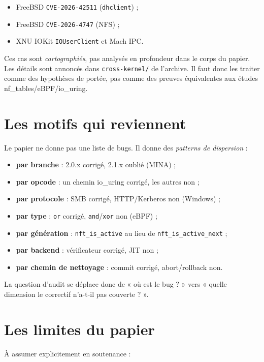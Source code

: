 \documentclass{training}
\begin{document}
\begin{itemize}
  \item FreeBSD \texttt{CVE-2026-42511} (\texttt{dhclient}) ;
  \item FreeBSD \texttt{CVE-2026-4747} (NFS) ;
  \item XNU IOKit \texttt{IOUserClient} et Mach IPC.
\end{itemize}

Ces cas sont \emph{cartographiés}, pas analysés en profondeur dans le corps du
papier. Les détails sont annoncés dans \texttt{cross-kernel/} de l'archive.
Il faut donc les traiter comme des hypothèses de portée, pas comme des
preuves équivalentes aux études nf\_tables/eBPF/io\_uring.

\chapter{Les motifs qui reviennent}

Le papier ne donne pas une liste de bugs. Il donne des \emph{patterns de
dispersion} :

\begin{itemize}
  \item \textbf{par branche} : 2.0.x corrigé, 2.1.x oublié (MINA) ;
  \item \textbf{par opcode} : un chemin io\_uring corrigé, les autres non ;
  \item \textbf{par protocole} : SMB corrigé, HTTP/Kerberos non (Windows) ;
  \item \textbf{par type} : \texttt{or} corrigé, \texttt{and}/\texttt{xor}
        non (eBPF) ;
  \item \textbf{par génération} : \texttt{nft\_is\_active} au lieu de
        \texttt{nft\_is\_active\_next} ;
  \item \textbf{par backend} : vérificateur corrigé, JIT non ;
  \item \textbf{par chemin de nettoyage} : commit corrigé, abort/rollback non.
\end{itemize}

La question d'audit se déplace donc de « où est le bug ? » vers « quelle
dimension le correctif n'a-t-il pas couverte ? ».

\chapter{Les limites du papier}

À assumer explicitement en soutenance :
\end{document}
